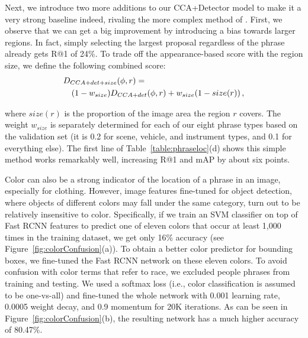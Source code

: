 \documentclass[twocolumn]{svjour3}
\begin{document}
Next, we introduce two more additions to our CCA+Detector model to make it a very strong baseline indeed, rivaling the more complex method of \cite{rohrbach2015}. First, we observe that we can get a big improvement by introducing a bias towards larger regions. In fact, simply selecting the largest proposal regardless of the phrase already gets R@1 of 24\%. To trade off the appearance-based score with the region size, we define the following combined score:
\begin{eqnarray}
\lefteqn{D_{CCA+det+size}(\phi,r) = } \\ \label{eq:sizetradeoff}
& & (1-w_{size})D_{CCA+det}(\phi,r) + w_{size}(1-size(r)) \,, \nonumber
\end{eqnarray}

\noindent where $size(r)$ is the proportion of the image area the region $r$ covers.  The weight $w_{size}$ is separately determined for each of our eight phrase types based on the validation set (it is 0.2 for scene, vehicle, and instrument types, and 0.1 for everything else). The first line of Table~\ref{table:phraseloc}(d) shows this simple method works remarkably well, increasing R@1 and mAP by about six points.



Color can also be a strong indicator of the location of a phrase in an image, especially for clothing. However, image features fine-tuned for object detection, where objects of different colors may fall under the same category, turn out to be relatively insensitive to color. Specifically, if we train an SVM classifier on top of Fast RCNN features to predict one of eleven colors that occur at least 1,000 times in the training dataset, we get only 16\% accuracy (see Figure~\ref{fig:colorConfusion}(a)). 
To obtain a better color predictor for bounding boxes, we fine-tuned the Fast RCNN network on these eleven colors. To avoid confusion with color terms that refer to race, we excluded people phrases from training and testing. We used a softmax loss (i.e., color classification is assumed to be one-vs-all) and fine-tuned the whole network with 0.001 learning rate, 0.0005 weight decay, and 0.9 momentum for 20K iterations.  As can be seen in Figure~\ref{fig:colorConfusion}(b), the resulting network has a much higher accuracy of 80.47\%.  
\end{document}
